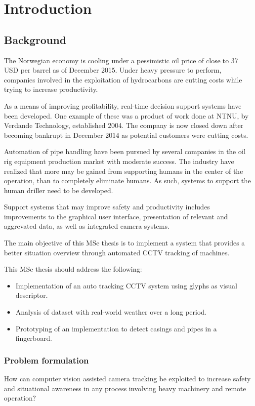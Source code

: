 \chapter{Introduction}
\setcounter{page}{1}
\section{Background}
The Norwegian economy is cooling under a pessimistic oil price of close to 37 USD per barrel as of December 2015. Under heavy pressure to perform, companies involved in the exploitation of hydrocarbons are cutting costs while trying to increase productivity.

As a means of improving profitability, real-time decision support systems have been developed. One example of these was a product of work done at NTNU, by Verdande Technology, established 2004. The company is now closed down after becoming bankrupt in December 2014 as potential customers were cutting costs.

Automation of pipe handling have been pursued by several companies in the oil rig equipment production market with moderate success. The industry have realized that more may be gained from supporting humans in the center of the operation, than to completely eliminate humans. As such, systems to support the human driller need to be developed.

Support systems that may improve safety and productivity includes improvements to the graphical user interface, presentation of relevant and aggrevated data, as well as integrated camera systems.

The main objective of this MSc thesis is to implement a system that provides a better situation overview through automated CCTV tracking of machines.

This MSc thesis should address the following:
\begin{itemize}
\item Implementation of an auto tracking CCTV system using glyphs as visual descriptor.
\item Analysis of dataset with real-world weather over a long period.
\item Prototyping of an implementation to detect casings and pipes in a fingerboard.
\end{itemize}

\subsection{Problem formulation}
How can computer vision assisted camera tracking be exploited to increase safety and situational awareness in any process involving heavy machinery and remote operation?

